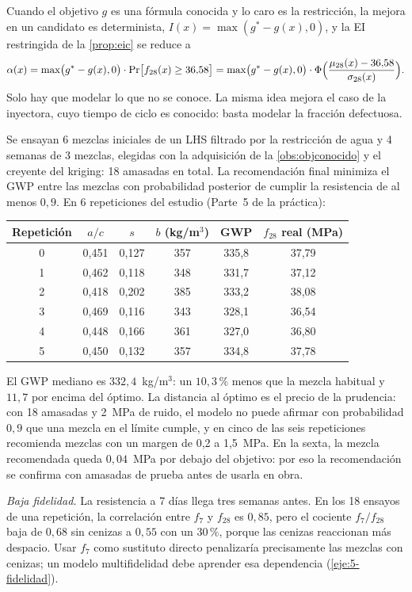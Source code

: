 \begin{observacion}\label{obs:objconocido}
Cuando el objetivo $g$ es una fórmula conocida y lo caro es la restricción, la mejora en un candidato es determinista, $I(x)=\max(g^*-g(x),0)$, y la EI restringida de la \cref{prop:eic} se reduce a
\[
\alpha(x)=\max\bigl(g^*-g(x),0\bigr)\cdot\Pr\bigl[f_{28}(x)\ge 36{,}58\bigr]=\max\bigl(g^*-g(x),0\bigr)\cdot\Phi\Bigl(\frac{\mu_{28}(x)-36{,}58}{\sigma_{28}(x)}\Bigr).
\]
Solo hay que modelar lo que no se conoce. La misma idea mejora el caso de la inyectora, cuyo tiempo de ciclo es conocido: basta modelar la fracción defectuosa.
\end{observacion}

\begin{ejemplo}\label{ej:casoB}
Se ensayan 6 mezclas iniciales de un LHS filtrado por la restricción de agua y 4 semanas de 3 mezclas, elegidas con la adquisición de la \cref{obs:objconocido} y el creyente del kriging: 18 amasadas en total. La recomendación final minimiza el GWP entre las mezclas con probabilidad posterior de cumplir la resistencia de al menos $0{,}9$. En 6 repeticiones del estudio (Parte~5 de la práctica):
\begin{center}\small
\begin{tabular}{@{}cccccc@{}}
\toprule
Repetición & $a/c$ & $s$ & $b$ (kg/m$^3$) & GWP & $f_{28}$ real (MPa) \\
\midrule
0 & 0{,}451 & 0{,}127 & 357 & 335{,}8 & 37{,}79 \\
1 & 0{,}462 & 0{,}118 & 348 & 331{,}7 & 37{,}12 \\
2 & 0{,}418 & 0{,}202 & 385 & 333{,}2 & 38{,}08 \\
3 & 0{,}469 & 0{,}116 & 343 & 328{,}1 & 36{,}54 \\
4 & 0{,}448 & 0{,}166 & 361 & 327{,}0 & 36{,}80 \\
5 & 0{,}450 & 0{,}132 & 357 & 334{,}8 & 37{,}78 \\
\bottomrule
\end{tabular}
\end{center}
El GWP mediano es $332{,}4$~kg/m$^3$: un $10{,}3\,\%$ menos que la mezcla habitual y $11{,}7$ por encima del óptimo. La distancia al óptimo es el precio de la prudencia: con 18 amasadas y 2~MPa de ruido, el modelo no puede afirmar con probabilidad $0{,}9$ que una mezcla en el límite cumple, y en cinco de las seis repeticiones recomienda mezclas con un margen de 0,2 a 1,5~MPa. En la sexta, la mezcla recomendada queda $0{,}04$~MPa por debajo del objetivo: por eso la recomendación se confirma con amasadas de prueba antes de usarla en obra.

\emph{Baja fidelidad.} La resistencia a 7 días llega tres semanas antes. En los 18 ensayos de una repetición, la correlación entre $f_7$ y $f_{28}$ es $0{,}85$, pero el cociente $f_7/f_{28}$ baja de $0{,}68$ sin cenizas a $0{,}55$ con un $30\,\%$, porque las cenizas reaccionan más despacio. Usar $f_7$ como sustituto directo penalizaría precisamente las mezclas con cenizas; un modelo multifidelidad debe aprender esa dependencia (\cref{eje:5-fidelidad}).
\end{ejemplo}

